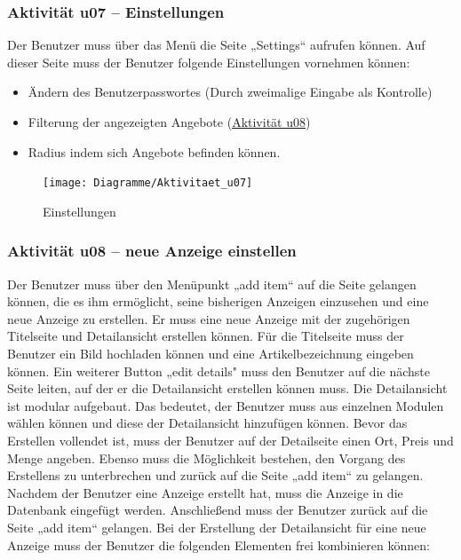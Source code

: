 \documentclass[a4paper,12pt,oneside]{scrartcl}
\begin{document}
\subsubsection{Aktivität u07 – Einstellungen}
Der Benutzer muss über das Menü die Seite „Settings“ aufrufen können.
Auf dieser Seite muss der Benutzer folgende Einstellungen vornehmen können:
\begin{itemize}
	\item Ändern des Benutzerpasswortes (Durch zweimalige Eingabe als Kontrolle)
	\item Filterung der angezeigten Angebote (\hyperlink{u08}{Aktivität u08})
	\item Radius indem sich Angebote befinden können.
\end{itemize}

\begin{figure}[!htbp]
\centering
\noindent\texttt{[image: Diagramme/Aktivitaet\_u07]}
\caption{Einstellungen}
\end{figure}
\FloatBarrier


\hypertarget{u08}{\subsubsection{Aktivität u08 – neue Anzeige einstellen}}
Der Benutzer muss über den Menüpunkt „add item“ auf die Seite gelangen können, die es ihm ermöglicht, seine bisherigen Anzeigen einzusehen und eine neue Anzeige zu erstellen. 
Er muss eine neue Anzeige mit der zugehörigen Titelseite und Detailansicht erstellen können.
Für die Titelseite muss der Benutzer ein Bild hochladen können und eine Artikelbezeichnung eingeben können. 
Ein weiterer Button „edit details"  muss den Benutzer auf die nächste Seite leiten, auf der er die Detailansicht erstellen können muss. 
Die Detailansicht ist modular aufgebaut. Das bedeutet, der Benutzer muss aus einzelnen Modulen wählen können und diese der Detailansicht hinzufügen können.
Bevor das Erstellen vollendet ist, muss der Benutzer auf der Detailseite einen Ort, Preis und Menge angeben.
Ebenso muss die Möglichkeit bestehen, den Vorgang des Erstellens zu unterbrechen und zurück auf die Seite „add item“ zu gelangen.
Nachdem der Benutzer eine Anzeige erstellt hat, muss die Anzeige in die Datenbank eingefügt werden.
Anschließend muss der Benutzer zurück auf die Seite „add item“ gelangen. 
Bei der Erstellung der Detailansicht für eine neue Anzeige muss der Benutzer die folgenden Elementen frei kombinieren können:
\end{document}
